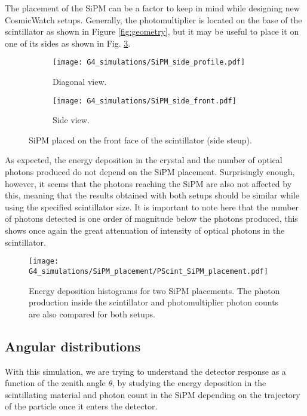 The placement of the SiPM can be a factor to keep in mind while designing new CosmicWatch setups. Generally, the photomultiplier is located on the base of the scintillator as shown in Figure \ref{fig:geometry}, but it may be useful to place it on one of its sides as shown in Fig. \ref{fig:SiPM_side}.
\begin{figure}
  \centering
  \begin{subfigure}[t]{0.48\textwidth}
    \texttt{[image: G4\_simulations/SiPM\_side\_profile.pdf]}
    \caption{\label{sfig:SiPM_side_profile}Diagonal view.}
  \end{subfigure}
  \hfill
  \begin{subfigure}[t]{0.48\textwidth}
    \texttt{[image: G4\_simulations/SiPM\_side\_front.pdf]}
    \caption{\label{sfig:SiPM_side_front}Side view.}
  \end{subfigure}
  \caption{\label{fig:SiPM_side}SiPM placed on the front face of the scintillator (side steup).}
\end{figure}

As expected, the energy deposition in the crystal and the number of optical photons produced do not depend on the SiPM placement. Surprisingly enough, however, it seems that the photons reaching the SiPM are also not affected by this, meaning that the results obtained with both setups should be similar while using the specified scintillator size. It is important to note here that the number of photons detected is one order of magnitude below the photons produced, this shows once again the great attenuation of intensity of optical photons in the scintillator.

\begin{figure}[H]
  \centering
  \texttt{[image: G4\_simulations/SiPM\_placement/PScint\_SiPM\_placement.pdf]}
  \caption{\label{fig:LYSO_PScint_phot_count}Energy deposition histograms for two SiPM placements. The photon production inside the scintillator and photomultiplier photon counts are also compared for both setups.}
\end{figure}

\subsection{Angular distributions}\label{sec:cos_squared}

With this simulation, we are trying to understand the detector response as a function of the zenith angle $\theta$, by studying the energy deposition in the scintillating material and photon count in the SiPM depending on the trajectory of the particle once it enters the detector.

